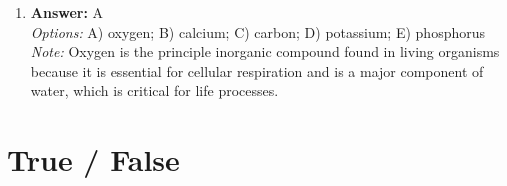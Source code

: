 \documentclass[12pt]{article}
\begin{document}
\begin{enumerate}[label=\arabic*.]
\\ \textit{Note:} Ferns possess a well-developed vascular system that allows for more efficient transport of water and nutrients, enabling them to perform photosynthesis at a greater scale than mosses, which lack this system and are limited in size.
\item \textbf{Answer:} A
\\ \textit{Options:} A) oxygen; B) calcium; C) carbon; D) potassium; E) phosphorus
\\ \textit{Note:} Oxygen is the principle inorganic compound found in living organisms because it is essential for cellular respiration and is a major component of water, which is critical for life processes.
\end{enumerate}

\section*{True / False}
\end{document}
